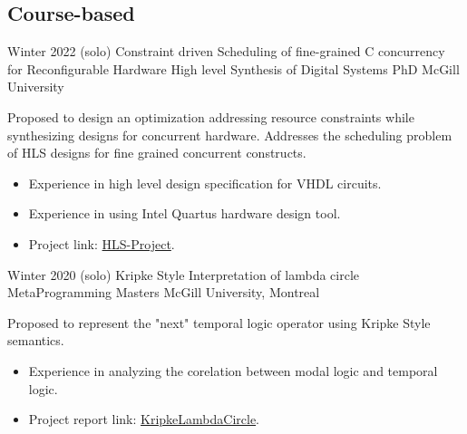     \subsection{Course-based}

        \cventry
            {Winter 2022 (solo)} %
            {Constraint driven Scheduling of fine-grained C concurrency for Reconfigurable Hardware} %
            {High level Synthesis of Digital Systems} %
            {PhD} 
            {McGill University} %
            {
                Proposed to design an optimization addressing resource constraints while synthesizing designs for concurrent hardware.
                Addresses the scheduling problem of HLS designs for fine grained concurrent constructs.
                \begin{itemize} %
                  \item Experience in high level design specification for VHDL circuits.
                  \item Experience in using Intel Quartus hardware design tool.
                  \item Project link: \href{https://github.com/jaag5678/COMP-764---HLS/tree/master/Project}{HLS-Project}.
                \end{itemize}
            }
            {}

        \cventry
            {Winter 2020 (solo)} %
            {Kripke Style Interpretation of lambda circle} %
            {MetaProgramming} %
            {Masters} 
            {McGill University, Montreal} %
            {
                Proposed to represent the "next" temporal logic operator using Kripke Style semantics.
                \begin{itemize} %
                    \item Experience in analyzing the corelation between modal logic and temporal logic. 
                    \item Project report link: \href{https://www.overleaf.com/read/vycfvpgbvvrp}{KripkeLambdaCircle}.
                \end{itemize}
            }
            {}

